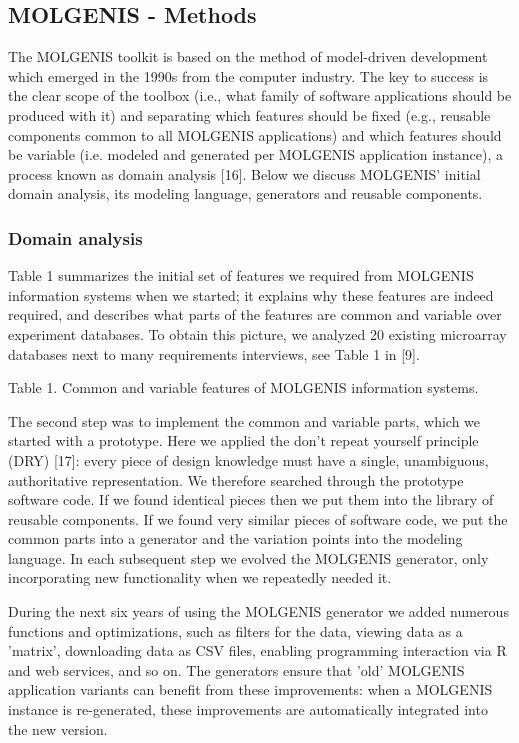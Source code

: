 \documentclass[8pt, twoside, a5paper]{report}
\begin{document}
\subsection{MOLGENIS - Methods}

The MOLGENIS toolkit is based on the method of model-driven development which emerged in the 1990s from the computer industry. 
The key to success is the clear scope of the toolbox (i.e., what family of software applications should be produced with it) 
and separating which features should be fixed (e.g., reusable components common to all MOLGENIS applications) and which 
features should be variable (i.e. modeled and generated per MOLGENIS application instance), a process known as domain 
analysis [16]. Below we discuss MOLGENIS' initial domain analysis, its modeling language, generators and reusable components. 

\subsubsection{Domain analysis}

Table 1 summarizes the initial set of features we required from MOLGENIS information systems when we started; it explains 
why these features are indeed required, and describes what parts of the features are common and variable over experiment 
databases. To obtain this picture, we analyzed 20 existing microarray databases next to many requirements interviews, see 
Table 1 in [9].

Table 1. Common and variable features of MOLGENIS information systems.

The second step was to implement the common and variable parts, which we started with a prototype. Here we applied the 
don't repeat yourself principle (DRY) [17]: every piece of design knowledge must have a single, unambiguous, authoritative 
representation. We therefore searched through the prototype software code. If we found identical pieces then we put them 
into the library of reusable components. If we found very similar pieces of software code, we put the common parts into a 
generator and the variation points into the modeling language. In each subsequent step we evolved the MOLGENIS generator, 
only incorporating new functionality when we repeatedly needed it.

During the next six years of using the MOLGENIS generator we added numerous functions and optimizations, such as filters for 
the data, viewing data as a 'matrix', downloading data as CSV files, enabling programming interaction via R and web services, 
and so on. The generators ensure that 'old' MOLGENIS application variants can benefit from these improvements: when a MOLGENIS 
instance is re-generated, these improvements are automatically integrated into the new version.
\end{document}
